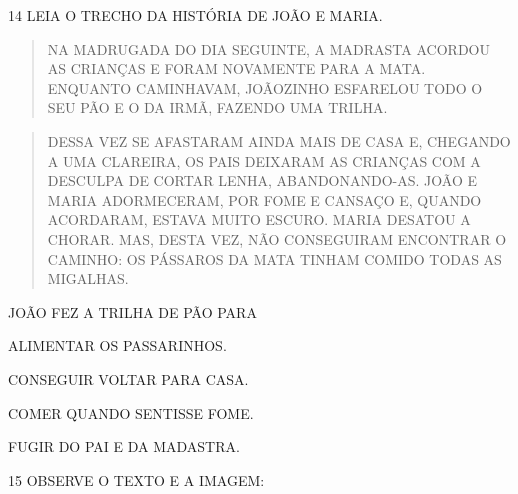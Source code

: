 \num{14} LEIA O TRECHO DA HISTÓRIA DE JOÃO E MARIA.

\begin{quote}
NA MADRUGADA DO DIA SEGUINTE, A MADRASTA ACORDOU AS CRIANÇAS E FORAM
NOVAMENTE PARA A MATA. ENQUANTO CAMINHAVAM, JOÃOZINHO ESFARELOU TODO O
SEU PÃO E O DA IRMÃ, FAZENDO UMA TRILHA.
\end{quote}

\begin{quote}
DESSA VEZ SE AFASTARAM AINDA
MAIS DE CASA E, CHEGANDO A UMA CLAREIRA, OS PAIS DEIXARAM AS CRIANÇAS
COM A DESCULPA DE CORTAR LENHA, ABANDONANDO-AS. JOÃO E MARIA
ADORMECERAM, POR FOME E CANSAÇO E, QUANDO ACORDARAM, ESTAVA MUITO
ESCURO. MARIA DESATOU A CHORAR. MAS, DESTA VEZ, NÃO CONSEGUIRAM
ENCONTRAR O CAMINHO: OS PÁSSAROS DA MATA TINHAM COMIDO TODAS AS
MIGALHAS.

\end{quote}

JOÃO FEZ A TRILHA DE PÃO PARA

\begin{escolha}
\item ALIMENTAR OS PASSARINHOS.

\item CONSEGUIR VOLTAR PARA CASA.

\item COMER QUANDO SENTISSE FOME.

\item FUGIR DO PAI E DA MADASTRA.
\end{escolha}

\num{15} OBSERVE O TEXTO E A IMAGEM:

